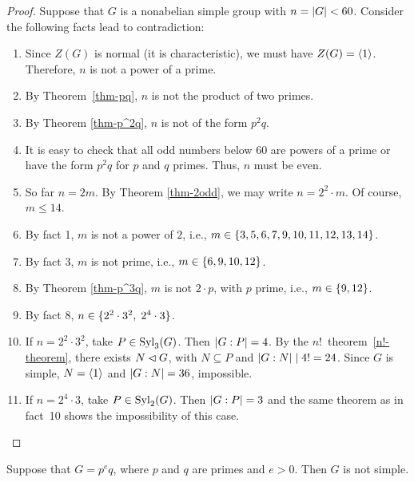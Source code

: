 \begin{proof} Suppose that $G$ is a nonabelian simple group with $n=\left\vert{G}\right\vert<60$. Consider the following facts lead to contradiction:
\begin{enumerate}[\rm 1.]
    \item Since $Z(G)$ is normal (it is characteristic), we must have $Z(G)=\langle1\rangle$. Therefore, $n$ is not a power of a prime.
    \item By Theorem~\ref{thm-pq}, $n$ is not the product of two primes.
    \item By Theorem \ref{thm-p^2q}, $n$ is not of the form $p^2q$.
    \item It is easy to check that all odd numbers below $60$ are powers of a prime or have the form $p^2q$ for $p$ and $q$ primes. Thus, $n$ must be even.
    \item So far $n=2m$. By Theorem \ref{thm-2odd}, we may write $n=2^2\cdot m$. Of course, $m\le14$.
    \item By fact {\rm1}, $m$ is not a power of $2$, i.e., $m\in\{3, 5, 6, 7, 9, 10, 11, 12, 13, 14\}$.
    \item By fact {\rm3}, $m$ is not prime, i.e., $m\in\{6,9,10,12\}$.
    \item By Theorem \ref{thm-p^3q}, $m$ is not $2\cdot p$, with $p$ prime, i.e., $m\in\{9,12\}$.
    \item By fact {\rm8}, $n\in\{2^2\cdot 3^2,\;2^4\cdot3\}$.
    \item If $n=2^2\cdot3^2$, take $P\in{\rm Syl}_3(G)$. Then $\left\vert{G:P}\right\vert=4$. By the $n!$~theorem~\ref{n!-theorem}, there exists $N\lhd G$, with $N\subseteq P$ and $\left\vert{G:N}\right\vert\mid4!=24$. Since $G$ is simple, $N=\langle1\rangle$ and $\left\vert{G:N}\right\vert=36$, impossible.
    \item If $n=2^4\cdot3$, take $P\in{\rm Syl}_2(G)$. Then $\left\vert{G:P}\right\vert=3$ and the same theorem as in fact~{\rm10} shows the impossibility of this case.
\end{enumerate}
 \end{proof}

\begin{thm}
    Suppose that\/ $G = p^eq$, where $p$ and $q$ are primes and $e>0$. Then $G$ is not simple.
\end{thm}

